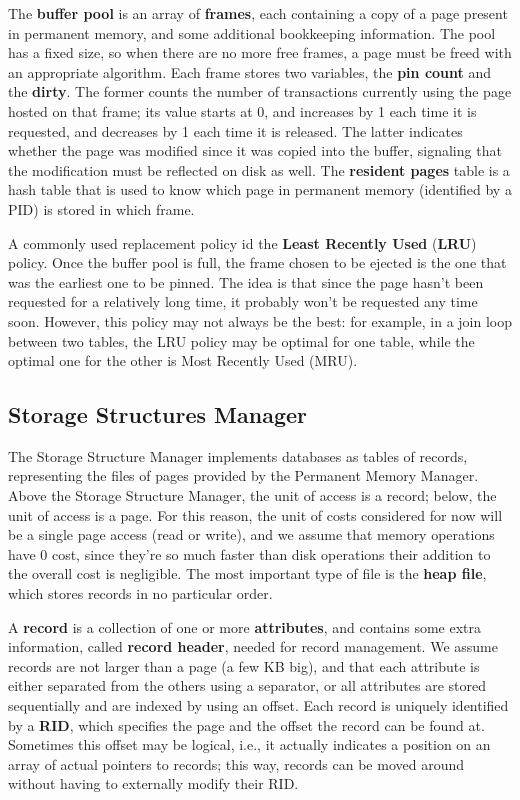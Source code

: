 The \textbf{buffer pool} is an array of \textbf{frames}, each containing a copy of a page present in permanent memory, and some additional bookkeeping information. The pool has a fixed size, so when there are no more free frames, a page must be freed with an appropriate algorithm. Each frame stores two variables, the \textbf{pin count} and the \textbf{dirty}. The former counts the number of transactions currently using the page hosted on that frame; its value starts at 0, and increases by 1 each time it is requested, and decreases by 1 each time it is released. The latter indicates whether the page was modified since it was copied into the buffer, signaling that the modification must be reflected on disk as well. The \textbf{resident pages} table is a hash table that is used to know which page in permanent memory (identified by a PID) is stored in which frame.

A commonly used replacement policy id the \textbf{Least Recently Used} (\textbf{LRU}) policy. Once the buffer pool is full, the frame chosen to be ejected is the one that was the earliest one to be pinned. The idea is that since the page hasn't been requested for a relatively long time, it probably won't be requested any time soon. However, this policy may not always be the best: for example, in a join loop between two tables, the LRU policy may be optimal for one table, while the optimal one for the other is Most Recently Used (MRU).

\subsection{Storage Structures Manager}

The Storage Structure Manager implements databases as tables of records, representing the files of pages provided by the Permanent Memory Manager. Above the Storage Structure Manager, the unit of access is a record; below, the unit of access is a page. For this reason, the unit of costs considered for now will be a single page access (read or write), and we assume that memory operations have 0 cost, since they're so much faster than disk operations their addition to the overall cost is negligible. The most important type of file is the \textbf{heap file}, which stores records in no particular order.

A \textbf{record} is a collection of one or more \textbf{attributes}, and contains some extra information, called \textbf{record header}, needed for record management. We assume records are not larger than a page (a few KB big), and that each attribute is either separated from the others using a separator, or all attributes are stored sequentially and are indexed by using an offset. Each record is uniquely identified by a \textbf{RID}, which specifies the page and the offset the record can be found at. Sometimes this offset may be logical, i.e., it actually indicates a position on an array of actual pointers to records; this way, records can be moved around without having to externally modify their RID.

